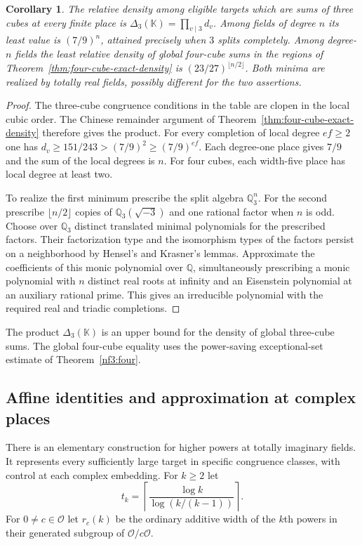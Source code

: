 \documentclass[11pt,letterpaper]{article}
\newtheorem{corollary}[corollary]{Corollary}
\theoremstyle{definition}
\numberwithin{equation}{section}
\begin{document}
\begin{corollary}\label{cor:three-local-density-degree}
The relative density among eligible targets which are sums of three
cubes at every finite place is $\Delta_3(\mathbb K)=\prod_{v\mid3}d_v$.
Among fields of degree $n$ its least value is $(7/9)^n$, attained
precisely when $3$ splits completely. Among degree-$n$ fields the
least relative density of global four-cube sums in the regions of
Theorem~\ref{thm:four-cube-exact-density} is
$(23/27)^{\lfloor n/2\rfloor}$. Both minima are realized by totally
real fields, possibly different for the two assertions.
\end{corollary}
\begin{proof}
The three-cube congruence conditions in the table are clopen in the
local cubic order. The Chinese remainder argument of
Theorem~\ref{thm:four-cube-exact-density} therefore gives the product.
For every completion of local degree $ef\ge2$ one has
$d_v\ge151/243>(7/9)^2\ge(7/9)^{ef}$. Each degree-one place gives
$7/9$ and the sum of the local degrees is $n$. For four cubes,
each width-five place has local degree at least two.

To realize the first minimum prescribe the split algebra
$\mathbb Q_3^n$. For the second prescribe $\lfloor n/2\rfloor$
copies of $\mathbb Q_3(\sqrt{-3})$ and one rational factor when
$n$ is odd. Choose over $\mathbb Q_3$ distinct translated minimal
polynomials for the prescribed factors. Their factorization type and
the isomorphism types of the factors persist on a neighborhood by
Hensel's and Krasner's lemmas. Approximate the coefficients of this
monic polynomial over $\mathbb Q$, simultaneously prescribing a
monic polynomial with $n$ distinct real roots at infinity and an
Eisenstein polynomial at an auxiliary rational prime. This gives an
irreducible polynomial with the required real and triadic completions.
\end{proof}
The product $\Delta_3(\mathbb K)$ is an upper bound for the density
of global three-cube sums. The global four-cube equality uses the
power-saving exceptional-set estimate of Theorem~\ref{nf3:four}.

\subsection{Affine identities and approximation at complex places}
\label{sec:complex-greedy}
There is an elementary construction for higher powers at totally
imaginary fields. It represents every sufficiently large target in
specific congruence classes, with control at each complex embedding.
For $k\ge2$ let
\[
      t_k=\left\lceil \frac{\log k}{\log(k/(k-1))}\right\rceil .
\]
For $0\ne c\in\mathcal O$ let $r_c(k)$ be the ordinary additive width
of the $k$th powers in their generated subgroup of $\mathcal O/c\mathcal O$.
\end{document}
